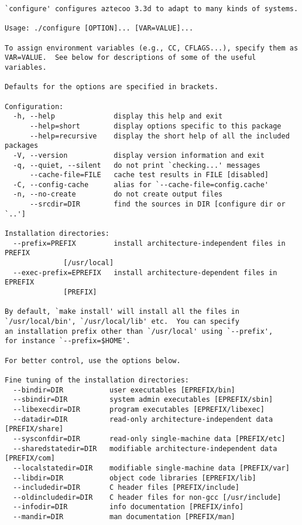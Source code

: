 \begin{verbatim}
`configure' configures aztecoo 3.3d to adapt to many kinds of systems.

Usage: ./configure [OPTION]... [VAR=VALUE]...

To assign environment variables (e.g., CC, CFLAGS...), specify them as
VAR=VALUE.  See below for descriptions of some of the useful variables.

Defaults for the options are specified in brackets.

Configuration:
  -h, --help              display this help and exit
      --help=short        display options specific to this package
      --help=recursive    display the short help of all the included packages
  -V, --version           display version information and exit
  -q, --quiet, --silent   do not print `checking...' messages
      --cache-file=FILE   cache test results in FILE [disabled]
  -C, --config-cache      alias for `--cache-file=config.cache'
  -n, --no-create         do not create output files
      --srcdir=DIR        find the sources in DIR [configure dir or `..']

Installation directories:
  --prefix=PREFIX         install architecture-independent files in PREFIX
			  [/usr/local]
  --exec-prefix=EPREFIX   install architecture-dependent files in EPREFIX
			  [PREFIX]

By default, `make install' will install all the files in
`/usr/local/bin', `/usr/local/lib' etc.  You can specify
an installation prefix other than `/usr/local' using `--prefix',
for instance `--prefix=$HOME'.

For better control, use the options below.

Fine tuning of the installation directories:
  --bindir=DIR           user executables [EPREFIX/bin]
  --sbindir=DIR          system admin executables [EPREFIX/sbin]
  --libexecdir=DIR       program executables [EPREFIX/libexec]
  --datadir=DIR          read-only architecture-independent data [PREFIX/share]
  --sysconfdir=DIR       read-only single-machine data [PREFIX/etc]
  --sharedstatedir=DIR   modifiable architecture-independent data [PREFIX/com]
  --localstatedir=DIR    modifiable single-machine data [PREFIX/var]
  --libdir=DIR           object code libraries [EPREFIX/lib]
  --includedir=DIR       C header files [PREFIX/include]
  --oldincludedir=DIR    C header files for non-gcc [/usr/include]
  --infodir=DIR          info documentation [PREFIX/info]
  --mandir=DIR           man documentation [PREFIX/man]


\end{verbatim}

